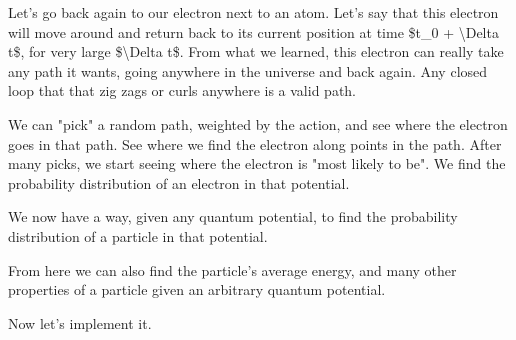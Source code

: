 \documentclass[]{article}
\begin{document}
Let's go back again to our electron next to an atom. Let's say that this
electron will move around and return back to its current position at time \$t\_0
+ \textbackslash{}Delta t\$, for very large \$\textbackslash{}Delta t\$. From
what we learned, this electron can really take any path it wants, going anywhere
in the universe and back again. Any closed loop that that zig zags or curls
anywhere is a valid path.

We can "pick" a random path, weighted by the action, and see where the electron
goes in that path. See where we find the electron along points in the path.
After many picks, we start seeing where the electron is "most likely to be". We
find the probability distribution of an electron in that potential.

We now have a way, given any quantum potential, to find the probability
distribution of a particle in that potential.

From here we can also find the particle's average energy, and many other
properties of a particle given an arbitrary quantum potential.

Now let's implement it.
\end{document}
